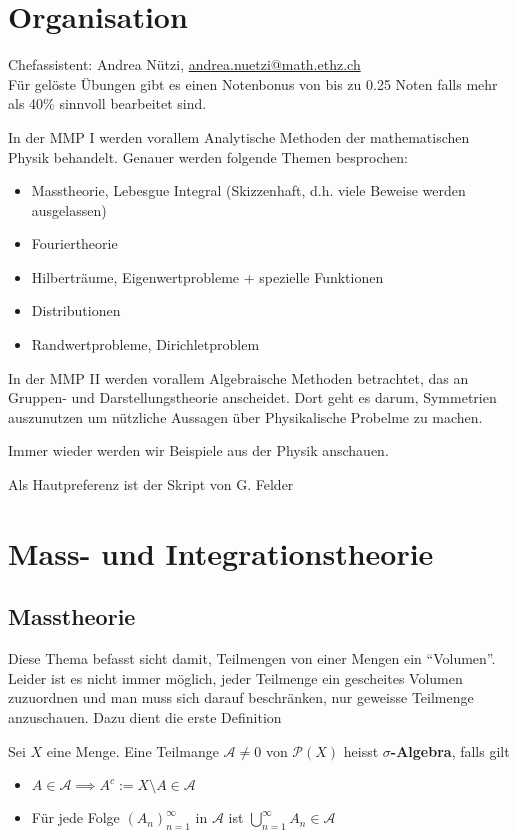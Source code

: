 \section*{Organisation}
Chefassistent: Andrea Nützi, \href{mailto:andrea.nuetzi@math.ethz.ch}{andrea.nuetzi@math.ethz.ch}\\

Für gelöste Übungen gibt es einen Notenbonus von bis zu 0.25 Noten falls mehr als 40\% sinnvoll bearbeitet sind.


In der MMP I werden vorallem Analytische Methoden der mathematischen Physik behandelt. Genauer werden folgende Themen besprochen:

\begin{itemize}
				\item Masstheorie, Lebesgue Integral (Skizzenhaft, d.h. viele Beweise werden ausgelassen)
	\item Fouriertheorie
	\item Hilberträume, Eigenwertprobleme + spezielle Funktionen
	\item	Distributionen 
	\item Randwertprobleme, Dirichletproblem
\end{itemize}

In der MMP II werden vorallem Algebraische Methoden betrachtet, das an Gruppen- und Darstellungstheorie anscheidet. Dort geht es darum, Symmetrien auszunutzen um nützliche Aussagen über Physikalische Probelme zu machen.

Immer wieder werden wir Beispiele aus der Physik anschauen.


Als Hautpreferenz ist der Skript von G. Felder


\section{Mass- und Integrationstheorie}
\subsection{Masstheorie}
Diese Thema befasst sicht damit, Teilmengen von einer Mengen ein ``Volumen''. Leider ist es nicht immer möglich, jeder Teilmenge ein gescheites Volumen zuzuordnen und man muss sich darauf beschränken, nur geweisse Teilmenge anzuschauen. Dazu dient die erste Definition

\begin{definition}
				Sei $X$ eine Menge. Eine Teilmange $ \mathcal{A} \neq 0$ von $ \mathcal{P}(X)$ heisst \textbf{$\sigma$-Algebra}, falls gilt
			\begin{itemize}
			\item	$A \in \mathcal{A} \implies A^c := X \setminus A \in \mathcal{A}$
			\item Für jede Folge $(A_n)_{n=1}^{ \infty}$ in $ \mathcal{A}$ ist $\bigcup_{n=1}^{\infty} A_n \in \mathcal{A}$
			\end{itemize}
\end{definition}

